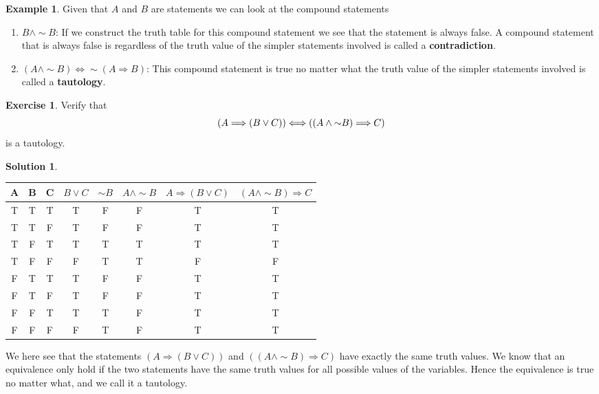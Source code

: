 \documentclass[a4paper, 11pt]{report}
\theoremstyle{plain}
\theoremstyle{definition}
\newtheorem{exmp}[thm]{Example}
\newtheorem{exrc}[thm]{Exercise}
\newtheorem*{sltn}{Solution}
\newcommand{\impl}{\Longrightarrow}
\newcommand{\eqvl}{\Longleftrightarrow}
\renewcommand{\neg}{{\sim}} %
\begin{document}
\begin{exmp}
  Given that $A$ and $B$ are statements we can look at the compound statements
  \begin{enumerate}
    \item $B \land \neg B$:
      If we construct the truth table for this compound statement we see that
      the statement is always false. A compound statement that is always false
      is regardless of the truth value of the simpler statements involved is
      called a \textbf{contradiction}. 
    \item $(A \land \neg B) \eqvl \neg (A \impl B)$:
      This compound statement is true no matter what the truth value of the
      simpler statements involved is called a
      \textbf{tautology}.
  \end{enumerate}
\end{exmp}

\pagebreak
\begin{exrc}
  Verify that
  \begin{equation}
    \notag
    (A \impl (B \lor C)) \eqvl ((A \land \neg B) \impl C)
  \end{equation}
  is a tautology.
\end{exrc}
\begin{sltn}
  \begin{table}[h!]
    \centering
    \begin{tabular}{cccccccc}
     \hline
     A& B & C & $B \lor C$ & $\neg B$ & $A \land \neg B$ & $A \impl (B \lor C)$ & $(A \land \neg B)\impl C$ \\
     \hline
     T& T & T & T & F & F & T & T\\ 
     T& T & F & T & F & F & T & T\\ 
     T& F & T & T & T & T & T & T\\ 
     T& F & F & F & T & T & F & F\\ 
     F& T & T & T & F & F & T & T\\ 
     F& T & F & T & F & F & T & T\\ 
     F& F & T & T & T & F & T & T\\ 
     F& F & F & F & T & F & T & T\\ 
     \hline
    \end{tabular}
  \end{table}
We here see that the statements $(A \impl (B \lor C))$ and $((A \land \neg B)
\impl C)$ have exactly the same truth values. We know that an equivalence only
hold if the two statements have the same truth values for all possible values
of the variables. Hence the equivalence is true no matter what, and we call it
a tautology.
\end{sltn}
\end{document}
